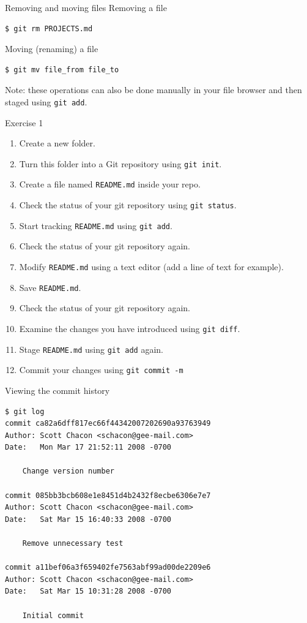 \documentclass[handout]{beamer}
\begin{document}
\begin{frame}[fragile]{Removing and moving files}
Removing a file
\begin{lstlisting}
$ git rm PROJECTS.md
\end{lstlisting}
Moving (renaming) a file
\begin{lstlisting}
$ git mv file_from file_to
\end{lstlisting}
Note: these operations can also be done manually in your file browser and then staged using \texttt{git add}.
\end{frame}

\begin{frame}{Exercise 1}
	\begin{enumerate}
		\item Create a new folder.
		\item Turn this folder into a Git repository using \texttt{git init}.
		\item Create a file named \texttt{README.md} inside your repo.
		\item Check the status of your git repository using \texttt{git status}.
		\item Start tracking \texttt{README.md} using \texttt{git add}.
		\item Check the status of your git repository again.
		\item Modify \texttt{README.md} using a text editor (add a line of text for example).
		\item Save \texttt{README.md}.
		\item Check the status of your git repository again.
		\item Examine the changes you have introduced using \texttt{git diff}.
		\item Stage \texttt{README.md} using \texttt{git add} again. 
		\item Commit your changes using \texttt{git commit -m}
	\end{enumerate}
\end{frame}

\begin{frame}[fragile]{Viewing the commit history}
\begin{lstlisting}
$ git log
commit ca82a6dff817ec66f44342007202690a93763949
Author: Scott Chacon <schacon@gee-mail.com>
Date:   Mon Mar 17 21:52:11 2008 -0700

    Change version number

commit 085bb3bcb608e1e8451d4b2432f8ecbe6306e7e7
Author: Scott Chacon <schacon@gee-mail.com>
Date:   Sat Mar 15 16:40:33 2008 -0700

    Remove unnecessary test
    
commit a11bef06a3f659402fe7563abf99ad00de2209e6
Author: Scott Chacon <schacon@gee-mail.com>
Date:   Sat Mar 15 10:31:28 2008 -0700

    Initial commit
\end{lstlisting}
\end{frame}
\end{document}
